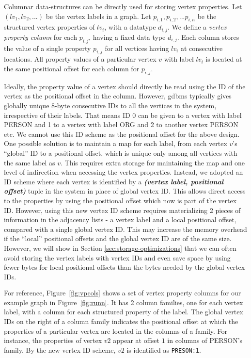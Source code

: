 Columnar data-structures can be directly used for storing vertex properties. Let $(lv_1, lv_2, ...)$ be the vertex labels in a graph. Let $p_{i,1},  p_{i,2}, ... p_{i, n}$ be the structured vertex properties of $lv_i$, with a datatype $d_{i,j}$. We define a \emph{vertex property column} for each $p_{i,j}$, having a fixed data type $d_{i,j}$. Each column stores the value of a single property $p_{i,j}$ for all vertices having $lv_i$ at consecutive locations. All property values of a particular vertex $v$ with label $lv_i$ is located at the same positional offset for each column for $p_{i,j}$. 


Ideally, the property value of a vertex should directly be read using the ID of the vertex as the positional offset in the column. However, \gls{gdbms} typically gives globally unique 8-byte consecutive IDs to all the vertices in the system, irrespective of their labels. That means ID 0 can be given to a vertex with label PERSON and 1 to a vertex with label ORG and 2 to another vertex PERSON etc. We cannot use this ID scheme as the positional offset for the above design. One possible solution is to maintain a map for each label, from each vertex $v$'s \enquote{global} ID to a positional offset, which is unique only among all vertices with the same label as $v$. This requires extra storage for maintaining the map and one level of indirection when accessing the vertex properties. Instead, we adopted an ID scheme where each vertex is identified by a \emph{\textbf{(vertex label, positional offset)}} tuple in the system in place of global vertex ID. This allows direct access to the properties by using the positional offset which now is part of the vertex ID. However, using this new vertex ID scheme requires materializing 2 pieces of information in the adjacency lists - a vertex label and a local positional offset, compared with a single global vertex ID. This may increase the memory overhead  if the \enquote{local} positional offsets and the global vertex ID are of the same size. However, we will show in Section \ref{sec:storage-optimizations} that we can often avoid storing the vertex labels with vertex IDs and even save space by using fewer bytes for local positional offsets than the bytes needed by the global vertex IDs.

For reference, Figure~\ref{fig:vpcols} shows a set of vertex property columns for our example graph in Figure~\ref{fig:runn}. It has 2 column families, one for each vertex label, with a column for each structured property of the label. The global vertex IDs on the right of a column family indicates the positional offset at which the properties of a particular vertex are located in the columns of a family. For instance, the properties of vertex $v2$ appear at offset $1$ in columns of PERSON's family. By the new vertex ID scheme, $v2$ is identified as \texttt{PRESON:1}. 

